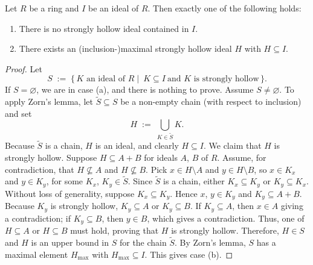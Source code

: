 \documentclass[10pt,a4paper]{amsart}
\begin{document}
\begin{theorem}\label{max_sh}
Let $R$ be a ring and $I$ be an ideal of $R$. Then exactly one of the following holds:
\begin{enumerate}
\item[\textup{(a)}] There is no strongly hollow ideal contained in $I$.
\item[\textup{(b)}] There exists an (inclusion-)maximal strongly hollow ideal $H$ with $H\subseteq I$.
\end{enumerate}
\end{theorem}

\begin{proof}
Let
\[
S\;:=\;\{\,K \text{ an ideal of } R\mid\ K\subseteq I\ \text{and }K\text{ is strongly hollow}\,\}.
\]
If $S=\varnothing$, we are in case \textup{(a)}, and there is nothing to prove.
Assume $S\neq\varnothing$. To apply Zorn's lemma, let $\widetilde S\subseteq S$ be a non-empty chain
(with respect to inclusion) and set
\[
H\;:=\;\bigcup_{K\in\widetilde S} K.
\]
Because $\widetilde S$ is a chain, $H$ is an ideal, and clearly $H\subseteq I$.
We claim that $H$ is strongly hollow. Suppose $H\subseteq A+B$ for ideals $A$, $B$ of $R$.
Assume, for contradiction, that $H\nsubseteq A$ and $H\nsubseteq B$.
Pick $x\in H\setminus A$ and $y\in H\setminus B$, so $x\in K_x$ and $y\in K_y$, for some $K_x$, $K_y\in\widetilde S$.
Since $\widetilde S$ is a chain, either $K_x\subseteq K_y$ or $K_y\subseteq K_x$.
Without loss of generality, suppose $K_x\subseteq K_y$. Hence $x$, $y\in K_y$ and $K_y\subseteq A+B$.
Because $K_y$ is strongly hollow, $K_y\subseteq A$ or $K_y\subseteq B$.
If $K_y\subseteq A$, then $x\in A$ giving a contradiction; if $K_y\subseteq B$, then $y\in B$, which gives a contradiction.
Thus, one of $H\subseteq A$ or $H\subseteq B$ must hold, proving that $H$ is strongly hollow.
Therefore, $H\in S$ and $H$ is an upper bound in $S$ for the chain $\widetilde S$.
By Zorn's lemma, $S$ has a maximal element $H_{\max}$ with $H_{\max}\subseteq I$.
This gives case \textup{(b)}.
\end{proof}
\end{document}
